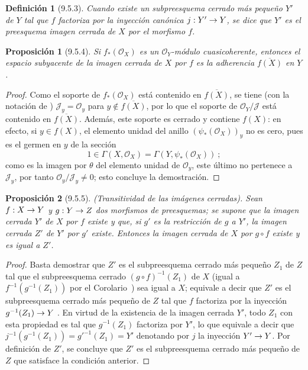 \documentclass[oneside]{amsart}
\theoremstyle{ega-env-style}
\theoremstyle{ega-thm-env-style}
\newtheorem*{proposition}{Proposición}
\theoremstyle{ega-defn-env-style}
\newtheorem*{definition}{Definición}
\renewcommand{\to}{\mathchoice{\longrightarrow}{\rightarrow}{\rightarrow}{\rightarrow}}
\let\EGAOriginalLabel\label
\renewcommand{\label}[1]{\phantomsection\EGAOriginalLabel{#1}}
\begin{document}
\begin{definition}[9.5.3]
\label{I.9.5.3}
{\itshape Cuando existe un subpreesquema cerrado más pequeño $Y'$ de $Y$ tal que $f$ factoriza
por la inyección canónica $j:Y'\to Y$, se dice que $Y'$ es el
preesquema \textup{imagen cerrada} de $X$ por el morfismo $f$.}
\end{definition}

\begin{proposition}[9.5.4]
\label{I.9.5.4}
Si $f_*(\mathscr{O}_X)$ es un $\mathscr{O}_Y$-módulo cuasicoherente, entonces el espacio subyacente
de la imagen cerrada de $X$ por $f$ es la adherencia $\overline{f(X)}$ en $Y$.
\end{proposition}

\begin{proof}
Como el soporte de $f_*(\mathscr{O}_X)$ está contenido en $\overline{f(X)}$, se tiene (con
la notación de ) $\mathscr{J}_y=\mathscr{O}_y$ para
$y\notin\overline{f(X)}$, por lo que el soporte de $\mathscr{O}_Y/\mathscr{J}$ está contenido en
$\overline{f(X)}$. Además, este soporte es cerrado y contiene $f(X)$:
en efecto, si $y\in f(X)$, el elemento unidad del anillo $(\psi_*(\mathscr{O}_X))_y$ no es
cero, pues es el germen en $y$ de la sección
\[
  1\in\Gamma(X,\mathscr{O}_X)=\Gamma(Y,\psi_*(\mathscr{O}_X))~;
\]
como es la imagen por $\theta$ del elemento unidad de $\mathscr{O}_y$, este último
no pertenece a $\mathscr{J}_y$, por tanto $\mathscr{O}_y/\mathscr{J}_y\neq0$; esto concluye la
demostración.
\end{proof}

\begin{proposition}[9.5.5]
\label{I.9.5.5}
\emph{(Transitividad de las imágenes cerradas).} Sean $f:X\to Y$ y $g:Y\to Z$ dos
morfismos de preesquemas; se supone que la imagen cerrada $Y'$ de $X$ por $f$ existe y que,
si $g'$ es la restricción de $g$ a $Y'$, la imagen cerrada $Z'$ de $Y'$ por $g'$ existe.
Entonces la imagen cerrada de $X$ por $g\circ f$ existe y es igual a $Z'$.
\end{proposition}

\begin{proof}
Basta  demostrar que $Z'$ es el subpreesquema cerrado más pequeño
$Z_1$ de $Z$ tal que el subpreesquema cerrado $(g\circ f)^{-1}(Z_1)$ de $X$
(igual a $f^{-1}(g^{-1}(Z_1))$ por el Corolario~) sea igual a
$X$; equivale a decir que $Z'$ es el subpreesquema cerrado más pequeño de $Z$ tal que
$f$ factoriza por la inyección $g^{-1}(Z_1)\to Y$ . En virtud de
la existencia de la imagen cerrada $Y'$, todo $Z_1$ con esta propiedad es tal que
$g^{-1}(Z_1)$ factoriza por $Y'$, lo que equivale a decir que
$j^{-1}(g^{-1}(Z_1))=g'^{-1}(Z_1)=Y'$ denotando por $j$ la inyección
$Y'\to Y$. Por definición de $Z'$, se concluye que $Z'$ es el subpreesquema cerrado
más pequeño de $Z$ que satisface la condición anterior.
\end{proof}
\end{document}
